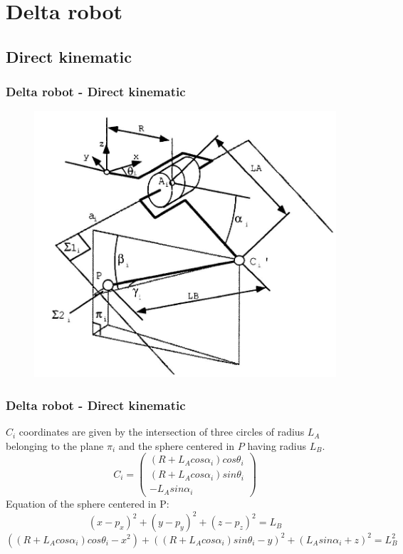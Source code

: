 %
\section[Delta robot]{Delta robot}
\subsection{Direct kinematic}
\begin{frame}
\frametitle{Delta robot - Direct kinematic}
	\begin{figure}
		\includegraphics[width=.5\linewidth]{img/DeltaRobotClavelpg26.JPG}
	\end{figure}
\end{frame}
%
\begin{frame}
\frametitle{Delta robot - Direct kinematic}
	$C_i$ coordinates are given by the intersection of three circles of radius $L_A$ belonging to the plane $\pi_i$ and the sphere centered in $P$ having radius $L_B$.
	\[
	C_i =%
	\begin{pmatrix}
		(R + L_Acos\alpha_i)cos\theta_i\\
		(R + L_Acos\alpha_i)sin\theta_i\\
		-L_Asin\alpha_i
	\end{pmatrix}
	\]
	Equation of the sphere centered in P:
	\begin{equation}
		(x - p_x)^2 + (y - p_y)^2 + (z - p_z)^2 = L_B
	\end{equation}
	\begin{equation}
		((R + L_Acos\alpha_i)cos\theta_i - x^2) + ((R + L_Acos\alpha_i)sin\theta_i - y)^2 + (L_Asin\alpha_i + z)^2 = L_B^2
	\end{equation}

\end{frame}
